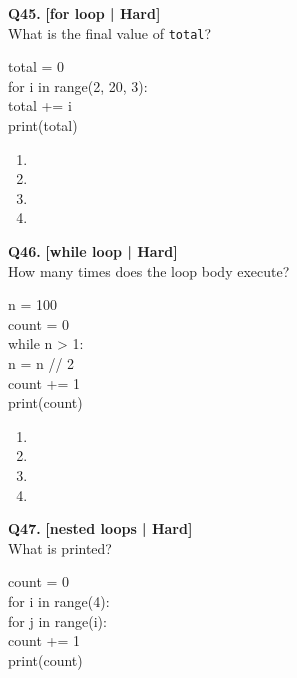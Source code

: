 \noindent\textbf{Q45.} \hfill {\small\color{LPUOrange}\textbf{[for loop | Hard]}}\\[2pt]
What is the final value of \texttt{total}? 

\begin{pycode}
total = 0\\
for i in range(2, 20, 3):\\
total += i\\
print(total)
\end{pycode}

\begin{enumerate}[label=(\alph*),topsep=2pt,itemsep=1pt,partopsep=0pt,parsep=0pt]
    \item {}
    \item {}
    \item {}
    \item {}
\end{enumerate}
\vspace{2mm}

\noindent\textbf{Q46.} \hfill {\small\color{LPUOrange}\textbf{[while loop | Hard]}}\\[2pt]
How many times does the loop body execute? 

\begin{pycode}
n = 100\\
count = 0\\
while n > 1:\\
n = n // 2\\
count += 1\\
print(count)
\end{pycode}

\begin{enumerate}[label=(\alph*),topsep=2pt,itemsep=1pt,partopsep=0pt,parsep=0pt]
    \item {}
    \item {}
    \item {}
    \item {}
\end{enumerate}
\vspace{2mm}

\noindent\textbf{Q47.} \hfill {\small\color{LPUOrange}\textbf{[nested loops | Hard]}}\\[2pt]
What is printed? 

\begin{pycode}
count = 0\\
for i in range(4):\\
for j in range(i):\\
count += 1\\
print(count)
\end{pycode}

